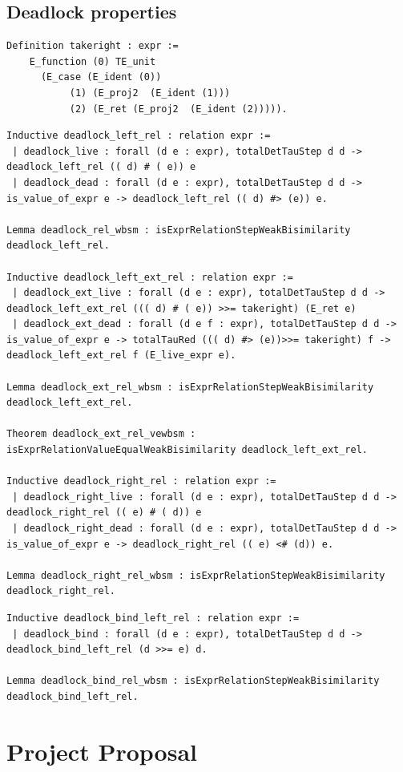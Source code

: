 \documentclass[12pt,twoside,notitlepage]{report}
\theoremstyle{plain}%
\theoremstyle{definition}
\theoremstyle{remark}
\begin{document}
\section{Deadlock properties}
\begin{minipage}{1\linewidth}
\begin{lstlisting}[language={Coq}, caption={The original Coq $\mathit{takeright}$ function}, label={lst:orig_coq_takeright},numbersep=11pt]
Definition takeright : expr :=
    E_function (0) TE_unit 
      (E_case (E_ident (0)) 
           (1) (E_proj2  (E_ident (1))) 
           (2) (E_ret (E_proj2  (E_ident (2))))).
\end{lstlisting}
\end{minipage}
\begin{minipage}{1\linewidth}
\begin{lstlisting}[language={Coq}, caption={Fork deadlock}, label={lst:orig_fork_deadlock},numbersep=11pt]
Inductive deadlock_left_rel : relation expr :=
 | deadlock_live : forall (d e : expr), totalDetTauStep d d -> deadlock_left_rel (( d) # ( e)) e
 | deadlock_dead : forall (d e : expr), totalDetTauStep d d -> is_value_of_expr e -> deadlock_left_rel (( d) #> (e)) e.
 
Lemma deadlock_rel_wbsm : isExprRelationStepWeakBisimilarity deadlock_left_rel.

Inductive deadlock_left_ext_rel : relation expr :=
 | deadlock_ext_live : forall (d e : expr), totalDetTauStep d d -> deadlock_left_ext_rel ((( d) # ( e)) >>= takeright) (E_ret e)
 | deadlock_ext_dead : forall (d e f : expr), totalDetTauStep d d -> is_value_of_expr e -> totalTauRed ((( d) #> (e))>>= takeright) f -> deadlock_left_ext_rel f (E_live_expr e).

Lemma deadlock_ext_rel_wbsm : isExprRelationStepWeakBisimilarity deadlock_left_ext_rel.

Theorem deadlock_ext_rel_vewbsm : isExprRelationValueEqualWeakBisimilarity deadlock_left_ext_rel.

Inductive deadlock_right_rel : relation expr :=
 | deadlock_right_live : forall (d e : expr), totalDetTauStep d d -> deadlock_right_rel (( e) # ( d)) e
 | deadlock_right_dead : forall (d e : expr), totalDetTauStep d d -> is_value_of_expr e -> deadlock_right_rel (( e) <# (d)) e.

Lemma deadlock_right_rel_wbsm : isExprRelationStepWeakBisimilarity deadlock_right_rel.
\end{lstlisting}
\end{minipage}
\begin{minipage}{\linewidth}
\begin{lstlisting}[language={Coq}, caption={Bind deadlock},label={lst:orig_bind_deadlock},numbersep=11pt]
Inductive deadlock_bind_left_rel : relation expr :=
 | deadlock_bind : forall (d e : expr), totalDetTauStep d d -> deadlock_bind_left_rel (d >>= e) d.

Lemma deadlock_bind_rel_wbsm : isExprRelationStepWeakBisimilarity deadlock_bind_left_rel.
\end{lstlisting}
\end{minipage}


\cleardoublepage

\chapter{Project Proposal}




\end{document}
